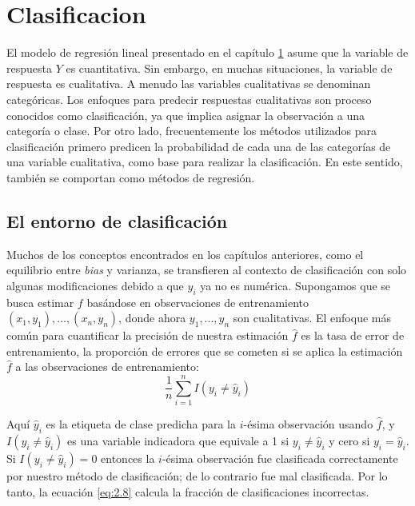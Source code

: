 \chapter{Clasificacion}\label{Chapter3} 


El modelo de regresión lineal presentado en el capítulo \ref{Chapter3} asume que la variable de respuesta $Y$ es cuantitativa. Sin embargo, en muchas situaciones, la variable de respuesta es cualitativa. A menudo las variables cualitativas se denominan categóricas. Los enfoques para predecir respuestas cualitativas son proceso conocidos como clasificación, ya que implica asignar la observación a una categoría o clase. Por otro lado, frecuentemente los métodos utilizados para clasificación primero predicen la probabilidad de cada una de las categorías de una variable cualitativa, como base para realizar la clasificación. En este sentido, también se comportan como métodos de regresión.

\section{El entorno de clasificación} \label{sec:3.1}

Muchos de los conceptos encontrados en los capítulos anteriores, como el equilibrio entre \textit{bias} y varianza, se transfieren al contexto de clasificación con solo algunas modificaciones debido a que $y_i$ ya no es numérica. Supongamos que se busca estimar $f$ basándose en observaciones de entrenamiento ${(x_1,y_1), \dots,(x_n,y_n)}$, donde ahora $y_1,...,y_n$ son cualitativas. El enfoque más común para cuantificar la precisión de nuestra estimación $\hat{f}$ es la tasa de error de entrenamiento, la proporción de errores que se cometen si se aplica la estimación $\hat{f}$ a las observaciones de entrenamiento:
\begin{equation}
\frac{1}{n}\sum_{i=1}^n I(y_i \neq \hat{y}_i)
\label{eq:2.8}
\end{equation}

Aquí $\hat{y}_i$ es la etiqueta de clase predicha para la $i$-ésima observación usando $\hat{f}$, y $I(y_i \neq \hat{y}_i)$ es una variable indicadora que equivale a 1 si $y_i \neq \hat{y}_i$ y cero si $y_i = \hat{y}_i$. Si $I(y_i \neq \hat{y}_i) = 0$ entonces la $i$-ésima observación fue clasificada correctamente por nuestro método de clasificación; de lo contrario fue mal clasificada. Por lo tanto, la ecuación \ref{eq:2.8} calcula la fracción de clasificaciones incorrectas. \\

